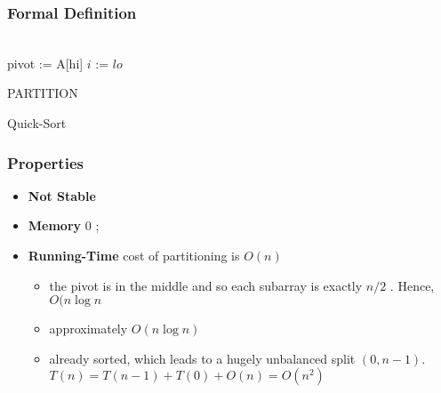 \subsubsection{Formal Definition}

	\begin{algorithm}[H]
	\DontPrintSemicolon
	\SetAlgoLined{}
	\\
	pivot := A[hi]\;
	$i$ := $lo$\;
	\caption{PARTITION}
	\end{algorithm}

	\begin{algorithm}[H]
	\DontPrintSemicolon
	\SetAlgoLined{}
	\;
	\caption{Quick-Sort}
	\end{algorithm}
	
	\subsubsection{Properties}

	\begin{itemize}
			\item\textbf{Not Stable}
			\item\textbf{Memory} $0$ ;  
			\item\textbf{Running-Time} cost of partitioning is $O(n)$
					\begin{itemize}
							\item[] the pivot is in the middle and so
									each subarray is exactly $n/2$ . Hence, $O(n
									\log n$
							\item[] approximately $O(n \log n)$
							\item[] already sorted, which leads to a
									hugely unbalanced split $(0, n-1)$. $T(n) =
									T(n-1) + T(0) + O(n) = O(n^2)$
					\end{itemize}
	\end{itemize}

